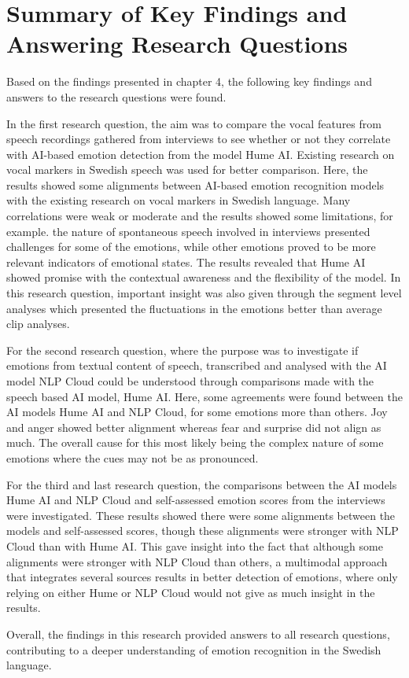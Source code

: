 \section{Summary of Key Findings and Answering Research Questions}
\label{sec:con-key-findings}
Based on the findings presented in chapter 4, the following key findings and answers to the research questions were found.

In the first research question, the aim was to compare the vocal features from speech recordings gathered from interviews to see whether or not they correlate with AI-based emotion detection from the model Hume AI. Existing research on vocal markers in Swedish speech was used for better comparison.
Here, the results showed some alignments between AI-based emotion recognition models with the existing research on vocal markers in Swedish language. Many correlations were weak or moderate and the results showed some limitations, for example. the nature of spontaneous speech involved in interviews presented challenges for some of the emotions, while other emotions proved to be more relevant indicators of emotional states. The results revealed that Hume AI showed promise with the contextual awareness and the flexibility of the model. 
In this research question, important insight was also given through the segment level analyses which presented the fluctuations in the emotions better than average clip analyses.

For the second research question, where the purpose was to investigate if emotions from textual content of speech, transcribed and analysed with the AI model NLP Cloud could be understood through comparisons made with the speech based AI model, Hume AI. Here, some agreements were found between the AI models Hume AI and NLP Cloud, for some emotions more than others. Joy and anger showed better alignment whereas fear and surprise did not align as much. The overall cause for this most likely being the complex nature of some emotions where the cues may not be as pronounced.

For the third and last research question, the comparisons between the AI models Hume AI and NLP Cloud and self-assessed emotion scores from the interviews were investigated. These results showed there were some alignments between the models and self-assessed scores, though these alignments were stronger with NLP Cloud than with Hume AI.
This gave insight into the fact that although some alignments were stronger with NLP Cloud than others, a multimodal approach that integrates several sources results in better detection of emotions, where only relying on either Hume or NLP Cloud would not give as much insight in the results.

Overall, the findings in this research provided answers to all research questions, contributing to a deeper understanding of emotion recognition in the Swedish language.